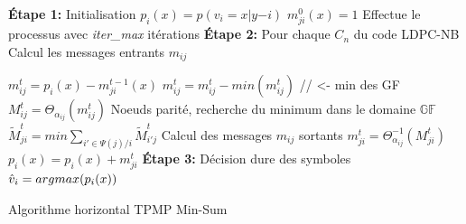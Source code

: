 \documentclass[../main.tex]{subfiles}
\begin{document}
\begin{algorithm}[t]   
{
        \small
        \begin{algorithmic}[1]
            \Statex \textbf{Étape 1:} Initialisation
            \State $p_i(x)=p(v_i=x|y{-i})$
            \State $m^0_{ji}(x)=1$
            \Statex \space \triangleright \space Effectue le processus avec \textit{iter\_max} itérations 
                \Statex \textbf{Étape 2:} Pour chaque $C_n$ du code LDPC-NB
                    \State \space \triangleright \space Calcul les messages entrants $m_{ij}$
                        
                        \State $m^t_{ij} = p_i(x) - m^{t-1}_{ji}(x) $
                        \State $m^t_{ij} = m^{t}_{ij} - min(m^t_{ij}) $ // <- min des GF 
                        \State $M^t_{ij} = \Theta_{\alpha_{ij}}(m^t_{ij})$
                    \EndFor
                    \State \space \triangleright \space Noeuds parité, recherche du minimum dans le domaine $\mathbb{GF}$
                        \State $\tilde{M}^t_{ji} = min \displaystyle\sum_{i'\in\Psi(j)/i} \tilde{M}^t_{i'j}$
                    \EndFor
                    \State \space \triangleright \space Calcul des messages $m_{ij}$ sortants
                        \State $m^t_{ji} = \Theta_{\alpha_{ij}}^{-1} (M^t_{ji})$
                        \State $ p_i(x) = p_i(x)+ m^t_{ji} $
                    \EndFor
                \EndFor
            \EndFor
            \Statex \textbf{Étape 3:} Décision dure des symboles
                \State $\hat{v}_i = arg \space max \space (p_i(x))$
            \EndFor
        \end{algorithmic}
    }
    \caption{\small Algorithme horizontal TPMP Min-Sum}
    \label{algo:ldpcnb_fftspa}
\end{algorithm}
\end{document}
